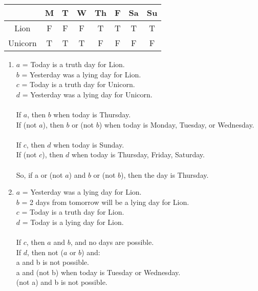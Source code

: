 \documentclass{article}
\begin{document}
\begin{center}
\begin{tabular}{c|c|c|c|c|c|c|c}
 & M & T & W & Th & F & Sa & Su \\
\hline
Lion & F & F & F & T & T & T & T \\
\hline
Unicorn & T & T & T & F & F & F & F \\

\end{tabular}
\end{center}
\begin{enumerate}[1.]
    \item 
        $a$ = Today is a truth day for Lion. \\
        $b$ = Yesterday was a lying day for Lion. \\
        $c$ = Today is a truth day for Unicorn. \\
        $d$ = Yesterday was a lying day for Unicorn. \\
        \\
        If $a$, then $b$ when today is Thursday. \\
        If (not $a$), then $b$ or (not $b$) when today is Monday, Tuesday, or Wednesday. \\
        \\
        If $c$, then $d$ when today is Sunday. \\
        If (not $c$), then $d$ when today is Thursday, Friday, Saturday. \\
        \\
        So, if a or (not $a$) and $b$ or (not $b$), then the day is Thursday.
    \item
        $a$ = Yesterday was a lying day for Lion. \\
        $b$ = 2 days from tomorrow will be a lying day for Lion. \\
        $c$ = Today is a truth day for Lion. \\ 
        $d$ = Today is a lying day for Lion. \\
        \\
        If $c$, then $a$ and $b$, and no days are possible. \\
        If $d$, then not ($a$ or $b$) and: \\
            a and b is not possible. \\
            a and (not b) when today is Tuesday or Wednesday. \\
            (not a) and b is not possible. \\

\end{enumerate}
\end{document}
